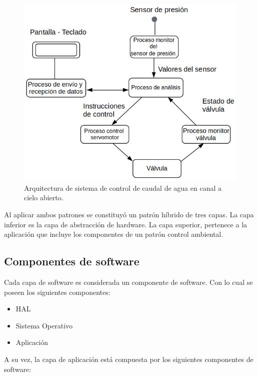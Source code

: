 \begin{figure}[htpb]
\centering
\includegraphics[scale=.65]{./Figures/ArquitecturaSoftware.png}
\caption{Arquitectura de sistema de control de caudal de agua en canal a cielo abierto.}
\label{fig:Arquitectura de software}
\end{figure}

Al aplicar ambos patrones se constituyó un patrón híbrido de tres capas. La capa inferior es la capa de abstracción de hardware. La capa superior, pertenece a la aplicación que incluye los componentes de un patrón control ambiental.


\subsection{Componentes de software}
\label{subsec:Componentes de software}
Cada capa de software es considerada un componente de software. Con lo cual se poseen los siguientes componentes:

\begin{itemize}
\item HAL
\item Sistema Operativo
\item Aplicación
\end{itemize}
A su vez, la capa de aplicación está compuesta por los siguientes componentes de software:

